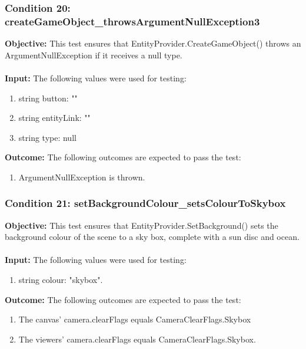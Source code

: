 \documentclass[a4paper,12pt]{article}
\begin{document}
		\subsubsection{Condition 20: createGameObject\_throwsArgumentNullException3}
			\textbf{Objective:} This test ensures that EntityProvider.CreateGameObject() throws an ArgumentNullException if it receives a null type.\\\\
			\textbf{Input:} The following values were used for testing:
				\begin{enumerate}
					\item string button: ""
					\item string entityLink: ""
					\item string type: null
				\end{enumerate}
			\textbf{Outcome:} The following outcomes are expected to pass the test:
				\begin{enumerate}
					\item ArgumentNullException is thrown.
				\end{enumerate}
		\subsubsection{Condition 21: setBackgroundColour\_setsColourToSkybox}
			\textbf{Objective:} This test ensures that EntityProvider.SetBackground() sets the background colour of the scene to a sky box, complete with a sun disc and ocean.\\\\
			\textbf{Input:} The following values were used for testing:
				\begin{enumerate}
					\item string colour: "skybox".
				\end{enumerate}
			\textbf{Outcome:} The following outcomes are expected to pass the test:
				\begin{enumerate}
					\item The canvas' camera.clearFlags equals CameraClearFlags.Skybox
					\item The viewers' camera.clearFlags equals CameraClearFlags.Skybox.
				\end{enumerate}
\end{document}
